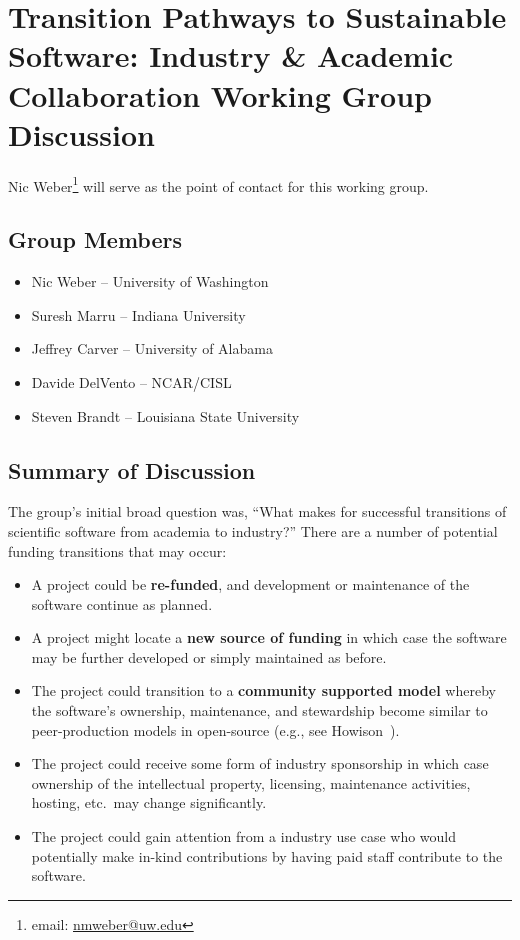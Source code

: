 \section{Transition Pathways to Sustainable Software: Industry \& Academic Collaboration Working Group Discussion}
\label{sec:appendix_industry_interaction}

Nic Weber\footnote{email: \href{mailto:nmweber@uw.edu}{nmweber@uw.edu}} will
serve as the point of contact for this working group.

\subsection{Group Members}

\begin{itemize}
\item Nic Weber -- University of Washington
\item Suresh Marru -- Indiana University
\item Jeffrey Carver -- University of Alabama
\item Davide DelVento -- NCAR/CISL
\item Steven Brandt -- Louisiana State University
\end{itemize} 

\subsection{Summary of Discussion}

The group's initial broad question was, ``What makes for successful transitions of
scientific software from academia to industry?'' There are a number of potential
funding transitions that may occur:
%
\begin{itemize}

\item A project could be \textbf{re-funded}, and development or maintenance of
the software continue as planned.

\item A project might locate a \textbf{new source of funding} in which case the
software may be further developed or simply maintained as before.

\item The project could transition to a \textbf{community supported model}
whereby the software's ownership, maintenance, and stewardship  become similar
to peer-production models in open-source (e.g., see
Howison~\cite{howison_sustaining_2015}).

\item The project could receive some form of industry sponsorship in which case
ownership of the intellectual property, licensing, maintenance activities,
hosting, etc.\ may change significantly.

\item The project could gain attention from a industry use case who would
potentially make in-kind contributions by having paid staff contribute to the
software.

\end{itemize}

